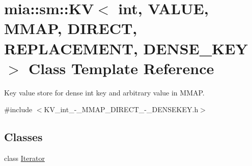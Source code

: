 \hypertarget{classmia_1_1sm_1_1_k_v_3_01int_00_01_v_a_l_u_e_00_01_m_m_a_p_00_01_d_i_r_e_c_t_00_01_r_e_p_l_a_c808626285fb72e917596de806785defa}{\section{mia\-:\-:sm\-:\-:K\-V$<$ int, V\-A\-L\-U\-E, M\-M\-A\-P, D\-I\-R\-E\-C\-T, R\-E\-P\-L\-A\-C\-E\-M\-E\-N\-T, D\-E\-N\-S\-E\-\_\-\-K\-E\-Y $>$ Class Template Reference}
\label{classmia_1_1sm_1_1_k_v_3_01int_00_01_v_a_l_u_e_00_01_m_m_a_p_00_01_d_i_r_e_c_t_00_01_r_e_p_l_a_c808626285fb72e917596de806785defa}
}


Key value store for dense int key and arbitrary value in M\-M\-A\-P.  




{\ttfamily \#include $<$K\-V\-\_\-int\-\_\--\/\-\_\-\-M\-M\-A\-P\-\_\-\-D\-I\-R\-E\-C\-T\-\_\--\/\-\_\-\-D\-E\-N\-S\-E\-K\-E\-Y.\-h$>$}

\subsection*{Classes}
\begin{DoxyCompactItemize}
\item 
class \hyperlink{classmia_1_1sm_1_1_k_v_3_01int_00_01_v_a_l_u_e_00_01_m_m_a_p_00_01_d_i_r_e_c_t_00_01_r_e_p_l_a_c777ddd58bcfb92c8593dd8ce3d26b512}{Iterator}
\end{DoxyCompactItemize}
